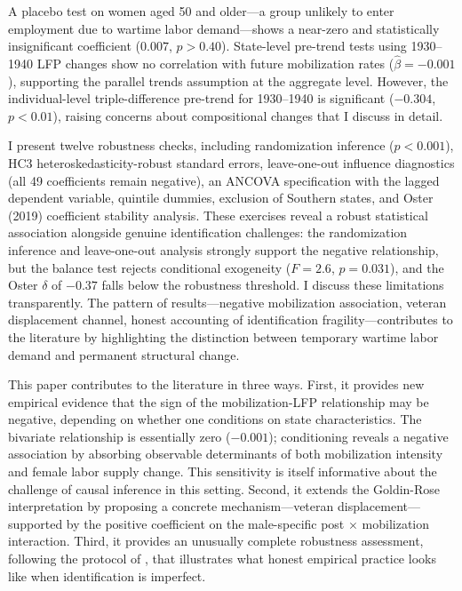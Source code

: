 \documentclass[12pt]{article}
\begin{document}
A placebo test on women aged 50 and older---a group unlikely to enter employment due to wartime labor demand---shows a near-zero and statistically insignificant coefficient ($0.007$, $p > 0.40$). State-level pre-trend tests using 1930--1940 LFP changes show no correlation with future mobilization rates ($\hat{\beta} = -0.001$), supporting the parallel trends assumption at the aggregate level. However, the individual-level triple-difference pre-trend for 1930--1940 is significant ($-0.304$, $p < 0.01$), raising concerns about compositional changes that I discuss in detail.

I present twelve robustness checks, including randomization inference ($p < 0.001$), HC3 heteroskedasticity-robust standard errors, leave-one-out influence diagnostics (all 49 coefficients remain negative), an ANCOVA specification with the lagged dependent variable, quintile dummies, exclusion of Southern states, and Oster (2019) coefficient stability analysis. These exercises reveal a robust statistical association alongside genuine identification challenges: the randomization inference and leave-one-out analysis strongly support the negative relationship, but the balance test rejects conditional exogeneity ($F = 2.6$, $p = 0.031$), and the Oster $\delta$ of $-0.37$ falls below the robustness threshold. I discuss these limitations transparently. The pattern of results---negative mobilization association, veteran displacement channel, honest accounting of identification fragility---contributes to the literature by highlighting the distinction between temporary wartime labor demand and permanent structural change.

This paper contributes to the literature in three ways. First, it provides new empirical evidence that the sign of the mobilization-LFP relationship may be negative, depending on whether one conditions on state characteristics. The bivariate relationship is essentially zero ($-0.001$); conditioning reveals a negative association by absorbing observable determinants of both mobilization intensity and female labor supply change. This sensitivity is itself informative about the challenge of causal inference in this setting. Second, it extends the Goldin-Rose interpretation by proposing a concrete mechanism---veteran displacement---supported by the positive coefficient on the male-specific post $\times$ mobilization interaction. Third, it provides an unusually complete robustness assessment, following the protocol of \citet{oster2019unobservable}, that illustrates what honest empirical practice looks like when identification is imperfect.
\end{document}
